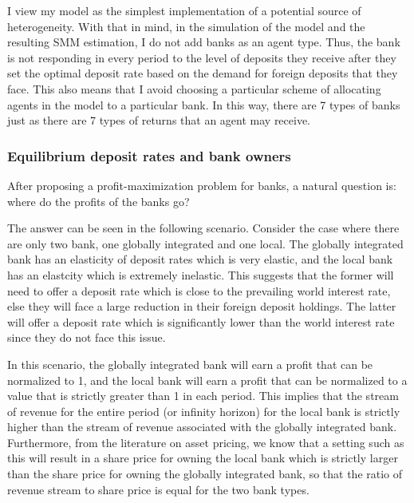 \par I view my model as the simplest implementation of a potential source of heterogeneity. With that in mind, in the simulation of the model and the resulting SMM estimation, I do not add banks as an agent type. Thus, the bank is not responding in every period to the level of deposits they receive after they set the optimal deposit rate based on the demand for foreign deposits that they face. This also means that I avoid choosing a particular scheme of allocating agents in the model to a particular bank. In this way, there are 7 types of banks just as there are 7 types of returns that an agent may receive. 

\subsubsection{Equilibrium deposit rates and bank owners}

\par After proposing a profit-maximization problem for banks, a natural question is: where do the profits of the banks go? 

\par The answer can be seen in the following scenario. Consider the case where there are only two bank, one globally integrated and one local. The globally integrated bank has an elasticity of deposit rates which is very elastic, and the local bank has an elastcity which is extremely inelastic. This suggests that the former will need to offer a deposit rate which is close to the prevailing world interest rate, else they will face a large reduction in their foreign deposit holdings. The latter will offer a deposit rate which is significantly lower than the world interest rate since they do not face this issue.

\par In this scenario, the globally integrated bank will earn a profit that can be normalized to 1, and the local bank will earn a profit that can be normalized to a value that is strictly greater than 1 in each period. This implies that the stream of revenue for the entire period (or infinity horizon) for the local bank is strictly higher than the stream of revenue associated with the globally integrated bank. Furthermore, from the literature on asset pricing, we know that a setting such as this will result in a share price for owning the local bank which is strictly larger than the share price for owning the globally integrated bank, so that the ratio of revenue stream to share price is equal for the two bank types.

\par

\par